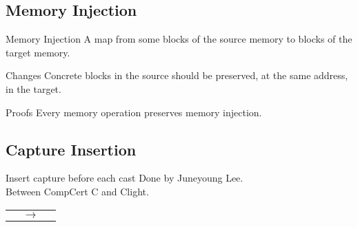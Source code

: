 \subsection{Memory Injection}
\begin{frame}{\subsecname}

  \begin{block}{Memory Injection}
    A map from some blocks of the source memory to blocks of the target memory.
  \end{block}
  \vfill
  \begin{block}{Changes}
  Concrete blocks in the source should be preserved, at the same address, in the target.
  \end{block}
  \vfill
  \begin{exampleblock}{Proofs}
    Every memory operation preserves memory injection.
  \end{exampleblock}
  
\end{frame}

\subsection{Capture Insertion}
\begin{frame}{\subsecname}

  \begin{block}{Insert capture before each cast}
  Done by Juneyoung Lee.\\
  Between CompCert C and Clight.
  \end{block}
  \vfill
  \begin{tabular}{l c r}        
     &
    $\longrightarrow$ & 
    
  \end{tabular}

\end{frame}

